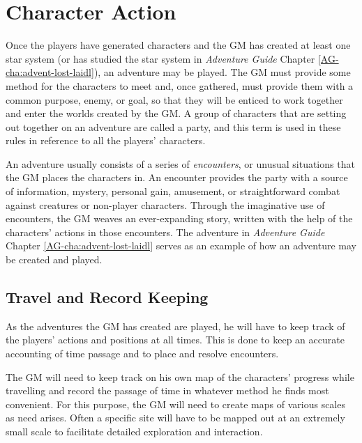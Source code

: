 

\chapter{Character Action}
\label{cha:character-action}

Once the players have generated characters and the GM has created at
least one star system (or has studied the star system in
\emph{Adventure Guide} Chapter
\ref{AG-cha:advent-lost-laidl}), an adventure may be played. The GM
must provide 
some method for the characters to meet and, once gathered, must
provide them with a common purpose, enemy, or goal, so that they will
be enticed to work together and enter the worlds created by the GM. A
group of characters that are setting out together on an adventure are
called a party, and this term is used in these rules in reference to
all the players' characters.

An adventure usually consists of a series of \emph{encounters}, or
unusual situations that the GM places the characters in. An encounter
provides the party with a source of information, mystery, personal
gain, amusement, or straightforward combat against creatures or
non-player characters. Through the imaginative use of encounters, the
GM weaves an ever-expanding story, written with the help of the
characters' actions in those encounters. The adventure in
\emph{Adventure Guide} Chapter
\ref{AG-cha:advent-lost-laidl} serves as an example of how an
adventure may be 
created and played.


\section{Travel and Record Keeping }
\label{sec:trav-record-keep}



As the adventures the GM has created are played, he will have to keep
track of the players' actions and positions at all times. This is done
to keep an accurate accounting of time passage and to place and
resolve encounters.

The GM will need to keep track on his own map of the characters'
progress while travelling and record the passage of time in whatever
method he finds most convenient. For this purpose, the GM will need to
create maps of various scales as need arises. Often a specific site
will have to be mapped out at an extremely small scale to facilitate
detailed exploration and interaction.


